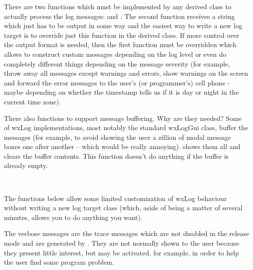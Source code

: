 \\
\\
\\
\\
\\

\label{loggingfunctions}

There are two functions which must be implemented by any derived class to
actually process the log messages:  and
. The second function receives a string
which just has to be output in some way and the easiest way to write a new log
target is to override just this function in the derived class. If more control
over the output format is needed, then the first function must be overridden
which allows to construct custom messages depending on the log level or even
do completely different things depending on the message severity (for example,
throw away all messages except warnings and errors, show warnings on the
screen and forward the error messages to the user's (or programmer's) cell
phone - maybe depending on whether the timestamp tells us if it is day or
night in the current time zone).

There also functions to support message buffering. Why are they needed?
Some of wxLog implementations, most notably the standard wxLogGui class,
buffer the messages (for example, to avoid showing the user a zillion of modal
message boxes one after another -- which would be really annoying).
 shows them all and clears the buffer contents.
This function doesn't do anything if the buffer is already empty.

\\

\label{wxlogcustomization}

The functions below allow some limited customization of wxLog behaviour
without writing a new log target class (which, aside of being a matter of
several minutes, allows you to do anything you want).

The verbose messages are the trace messages which are not disabled in the
release mode and are generated by . They
are not normally shown to the user because they present little interest, but
may be activated, for example, in order to help the user find some program
problem.

